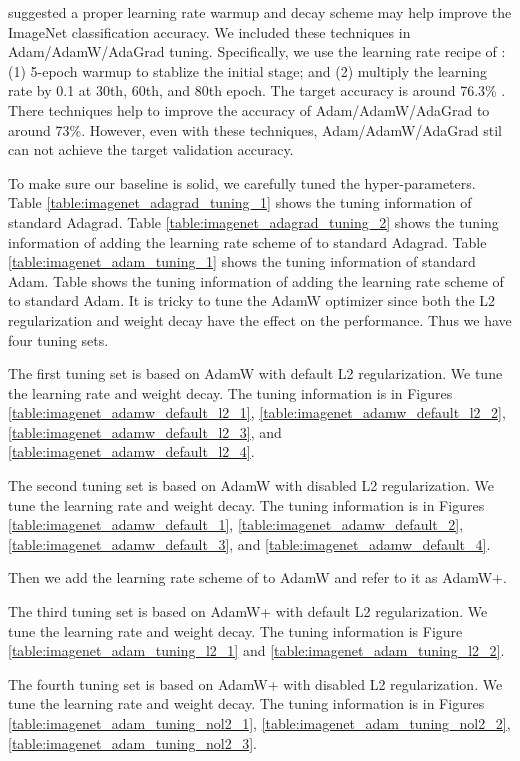 \documentclass{article} \usepackage{iclr2020_conference,times}
\begin{document}
\citet{goyal2017accurate} suggested a proper learning rate warmup and decay scheme may help improve the ImageNet classification accuracy. 
We included these techniques in Adam/AdamW/AdaGrad tuning.
Specifically, we use the learning rate recipe of \cite{goyal2017accurate}: (1) 5-epoch warmup to stablize the initial stage; and (2) multiply the learning rate by 0.1 at 30th, 60th, and 80th epoch. The target accuracy is around 76.3\% \citep{goyal2017accurate}.
There techniques help to improve the accuracy of Adam/AdamW/AdaGrad to around 73\%.
However, even with these techniques, Adam/AdamW/AdaGrad stil can not achieve the target validation accuracy.

To make sure our baseline is solid, we carefully tuned the hyper-parameters.
Table \ref{table:imagenet_adagrad_tuning_1} shows the tuning information of standard Adagrad.
Table \ref{table:imagenet_adagrad_tuning_2} shows the tuning information of adding the learning rate scheme of \cite{goyal2017accurate} to standard Adagrad.
Table \ref{table:imagenet_adam_tuning_1} shows the tuning information of standard Adam.
Table \label{table:imagenet_adam_tuning_2} shows the tuning information of adding the learning rate scheme of \cite{goyal2017accurate} to standard Adam.
It is tricky to tune the AdamW optimizer since both the L2 regularization and weight decay have the effect on the performance.
Thus we have four tuning sets.

The first tuning set is based on AdamW with default L2 regularization.
We tune the learning rate and weight decay.
The tuning information is in Figures \ref{table:imagenet_adamw_default_l2_1}, \ref{table:imagenet_adamw_default_l2_2}, \ref{table:imagenet_adamw_default_l2_3}, and \ref{table:imagenet_adamw_default_l2_4}.

The second tuning set is based on AdamW with disabled L2 regularization.
We tune the learning rate and weight decay.
The tuning information is in Figures \ref{table:imagenet_adamw_default_1}, \ref{table:imagenet_adamw_default_2}, \ref{table:imagenet_adamw_default_3}, and \ref{table:imagenet_adamw_default_4}.

Then we add the learning rate scheme of \cite{goyal2017accurate} to AdamW and refer to it as AdamW+.

The third tuning set is based on AdamW+ with default L2 regularization.
We tune the learning rate and weight decay.
The tuning information is Figure \ref{table:imagenet_adam_tuning_l2_1} and \ref{table:imagenet_adam_tuning_l2_2}.

The fourth tuning set is based on AdamW+ with disabled L2 regularization.
We tune the learning rate and weight decay.
The tuning information is in Figures \ref{table:imagenet_adam_tuning_nol2_1}, \ref{table:imagenet_adam_tuning_nol2_2}, \ref{table:imagenet_adam_tuning_nol2_3}.
\end{document}
